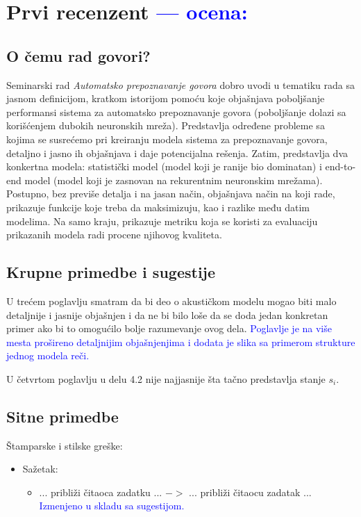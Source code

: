 \documentclass[a4paper]{report}
\newcommand{\odgovor}[1]{\textcolor{blue}{#1}}
\begin{document}
\chapter{Prvi recenzent \odgovor{--- ocena:} }
\section{O čemu rad govori?}
Seminarski rad \emph{Automatsko prepoznavanje govora} dobro uvodi u tematiku rada sa jasnom definicijom, kratkom istorijom pomoću koje objašnjava poboljšanje performansi sistema za automatsko prepoznavanje govora (poboljšanje dolazi sa korišćenjem dubokih neuronskih mreža). Predstavlja određene probleme sa kojima se susrećemo pri kreiranju modela sistema za prepoznavanje govora, detaljno i jasno ih objašnjava i daje potencijalna rešenja. Zatim, predstavlja dva konkertna modela: statistički model (model koji je ranije bio dominatan) i end-to-end model (model koji je zasnovan na rekurentnim neuronskim mrežama). Postupno, bez previše detalja i na jasan način, objašnjava način na koji rade, prikazuje funkcije koje treba da maksimizuju, kao i razlike među datim modelima. Na samo kraju, prikazuje metriku koja se koristi za evaluaciju prikazanih modela radi procene njihovog kvaliteta.

\section{Krupne primedbe i sugestije}
U trećem poglavlju smatram da bi deo o akustičkom modelu mogao biti malo detaljnije i jasnije objašnjen i da ne bi bilo loše da se doda jedan konkretan primer ako bi to omogućilo bolje razumevanje ovog dela.
\odgovor{Poglavlje je na više mesta prošireno detaljnijim objašnjenjima i dodata je slika sa primerom strukture jednog modela reči.}

U četvrtom poglavlju u delu 4.2 nije najjasnije šta tačno predstavlja stanje $s_i$.

\section{Sitne primedbe}
Štamparske i stilske greške:
\begin{itemize}
  \item Sažetak:
  \begin{itemize}
  \item ... približi čitaoca zadatku ... $->$ ... približi čitaocu zadatak ...\\ \odgovor{Izmenjeno u skladu sa sugestijom.}
 \end{itemize}
\end{itemize}
\end{document}
